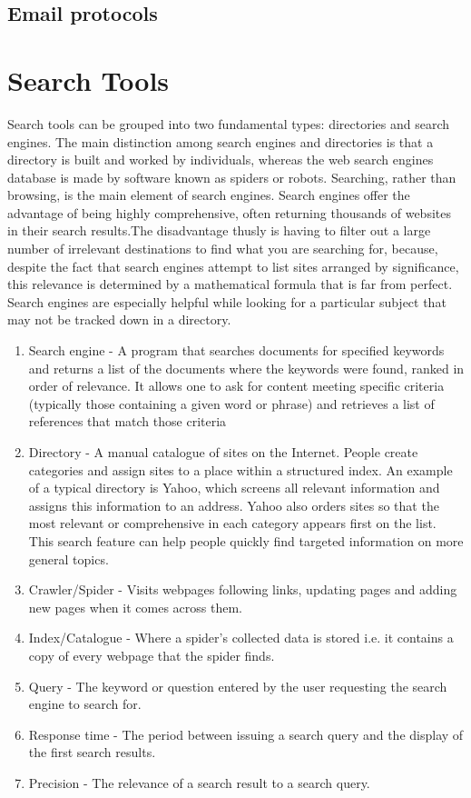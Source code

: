 \documentclass[10pt,twoside,english,a4paper]{article}
\begin{document}
\subsection{Email protocols} \label{protocols}
\cite{protocols}


\section{Search Tools} \label{search tools}
Search tools can be grouped into two fundamental types: directories and search engines. The main distinction among search engines and directories is that a directory is built and worked by individuals, whereas the web search engines database is made by software known as spiders or robots. Searching, rather than browsing, is the main element of search engines. Search engines offer the advantage of being highly comprehensive, often returning thousands of websites in their search results.The disadvantage thusly is having to filter out a large number of irrelevant destinations to find what you are searching for, because, despite the fact that search engines attempt to list sites arranged by significance, this relevance is determined by a mathematical formula that is far from perfect. Search engines are especially helpful while looking for a particular subject that may not be tracked down in a directory. 
\cite{searchEngines}
\begin{enumerate}
\item Search engine - A program that searches documents for specified keywords and returns a list of the documents where the keywords were found, ranked in order of relevance. It allows one to ask for content meeting specific criteria (typically those containing a given word or phrase) and retrieves a list of references that match those criteria
\item Directory - A manual catalogue of sites on the Internet. People create categories and assign sites to a place within a structured index. An example of a typical directory is Yahoo, which screens all relevant information and assigns this information to an address. Yahoo also orders sites so that the most relevant or comprehensive in each category appears first on the list. This search feature can help people quickly find targeted information on more general topics.
\item Crawler/Spider - Visits webpages following links, updating pages and adding new pages when it comes across them.
\item Index/Catalogue - Where a spider’s collected data is stored i.e. it contains a copy of every webpage that the spider finds.
\item Query - The keyword or question entered by the user requesting the search engine to search for. 
\item Response time - The period between issuing a search query and the display of the first search results.
\item Precision - The relevance of a search result to a search query.
\end{enumerate}
\end{document}

